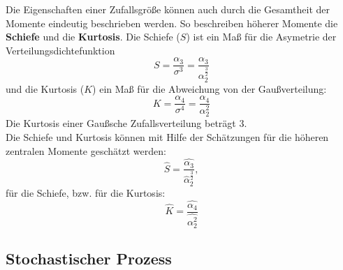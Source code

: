 Die Eigenschaften einer Zufallsgröße können auch durch die Gesamtheit der Momente eindeutig beschrieben werden. So beschreiben höherer Momente die \textbf{Schiefe} und die \textbf{Kurtosis}. Die Schiefe ($S$) ist ein Maß für die Asymetrie der Verteilungsdichtefunktion
\[
S = \frac {\alpha_3}{\sigma^3}=\frac {\alpha_3}{\alpha_2^{\frac{3}{2}}}
\]
und die Kurtosis ($K$) ein Maß für die Abweichung von der Gaußverteilung:
\[
K=\frac {\alpha_4}{\sigma^4}=\frac {\alpha_4}{\alpha_2^2}
\]
Die Kurtosis einer Gaußsche Zufallsverteilung beträgt 3.\\
Die Schiefe und Kurtosis können mit Hilfe der Schätzungen für die höheren zentralen Momente geschätzt werden:
\[
\hat S=\frac {\hat{\alpha_3}}{\hat{\alpha}_2^{\frac{3}{2}}},
\]
für die Schiefe, bzw. für die Kurtosis:
\[
\hat K=\frac {\hat{\alpha_4}}{\hat{\alpha_2^2}}
\]


\subsection{Stochastischer Prozess}

